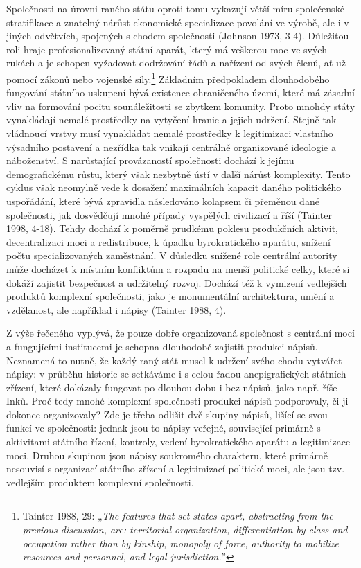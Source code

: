 Společnosti na úrovni raného státu oproti tomu vykazují větší míru společenské stratifikace a znatelný nárůst ekonomické specializace povolání ve výrobě, ale i v jiných odvětvích, spojených s chodem společnosti (Johnson 1973, 3-4). Důležitou roli hraje profesionalizovaný státní aparát, který má veškerou moc ve svých rukách a je schopen vyžadovat dodržování řádů a nařízení od svých členů, ať už pomocí zákonů nebo vojenské síly.\footnote{Tainter 1988, 29: „{\em The features that set states apart, abstracting from the previous discussion, are: territorial organization, differentiation by class and occupation rather than by kinship, monopoly of force, authority to mobilize resources and personnel, and legal jurisdiction.}”} Základním předpokladem dlouhodobého fungování státního uskupení bývá existence ohraničeného území, které má zásadní vliv na formování pocitu sounáležitosti se zbytkem komunity. Proto mnohdy státy vynakládají nemalé prostředky na vytyčení hranic a jejich udržení. Stejně tak vládnoucí vrstvy musí vynakládat nemalé prostředky k legitimizaci vlastního výsadního postavení a nezřídka tak vnikají centrálně organizované ideologie a náboženství. S narůstající provázaností společnosti dochází k jejímu demografickému růstu, který však nezbytně ústí v další nárůst komplexity. Tento cyklus však neomylně vede k dosažení maximálních kapacit daného politického uspořádání, které bývá zpravidla následováno kolapsem či přeměnou dané společnosti, jak dosvědčují mnohé případy vyspělých civilizací a říší (Tainter 1998, 4-18). Tehdy dochází k poměrně prudkému poklesu produkčních aktivit, decentralizaci moci a redistribuce, k úpadku byrokratického aparátu, snížení počtu specializovaných zaměstnání. V důsledku snížené role centrální autority může docházet k místním konfliktům a rozpadu na menší politické celky, které si dokáží zajistit bezpečnost a udržitelný rozvoj. Dochází též k vymizení vedlejších produktů komplexní společnosti, jako je monumentální architektura, umění a vzdělanost, ale například i nápisy (Tainter 1988, 4).

Z výše řečeného vyplývá, že pouze dobře organizovaná společnost s centrální mocí a fungujícími institucemi je schopna dlouhodobě zajistit produkci nápisů. Neznamená to nutně, že každý raný stát musel k udržení svého chodu vytvářet nápisy: v průběhu historie se setkáváme i s celou řadou anepigrafických státních zřízení, které dokázaly fungovat po dlouhou dobu i bez nápisů, jako např. říše Inků. Proč tedy mnohé komplexní společnosti produkci nápisů podporovaly, či ji dokonce organizovaly? Zde je třeba odlišit dvě skupiny nápisů, lišící se svou funkcí ve společnosti: jednak jsou to nápisy veřejné, související primárně s aktivitami státního řízení, kontroly, vedení byrokratického aparátu a legitimizace moci. Druhou skupinou jsou nápisy soukromého charakteru, které primárně nesouvisí s organizací státního zřízení a legitimizací politické moci, ale jsou tzv. vedlejším produktem komplexní společnosti.

